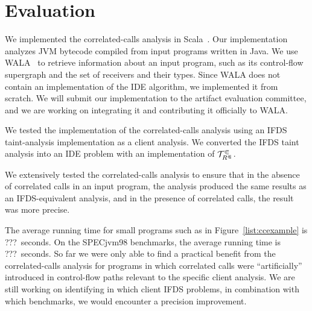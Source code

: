 \section{Evaluation}
  \label{sec:Evaluation}

We implemented the correlated-calls analysis in Scala~\cite{odersky2004overview}. 
Our implementation analyzes JVM bytecode compiled from input programs written
in Java.
We use WALA~\cite{fink2012wala}
to retrieve information about an input program, such as its control-flow supergraph and the set of receivers and their types.
Since WALA does not contain an implementation of the IDE algorithm,
we implemented it from scratch.
We will submit our implementation to the artifact evaluation committee, and we are working on integrating it and contributing it officially to WALA. %

We tested the implementation of the correlated-calls analysis using an IFDS taint-analysis implementation as a client analysis. We converted the IFDS taint analysis into an IDE problem with an implementation of $\mathcal T^\Subset_{R^\Subset}$.

We extensively tested the correlated-calls analysis to ensure that in the absence of correlated calls in an input program, the analysis produced the same results as an IFDS-equivalent analysis, and in the presence of correlated calls, the result was more precise.

The average running time for small programs such as in Figure~\ref{list:ccexample} is ???~seconds. On the SPECjvm98 benchmarks, the average running time is ???~seconds. So far we were only able to find a practical benefit from the correlated-calls analysis for programs in which correlated calls were ``artificially'' introduced in control-flow paths relevant to the specific client analysis. We are still working on identifying in which client IFDS problems, in combination with which benchmarks, we would encounter a precision improvement.

